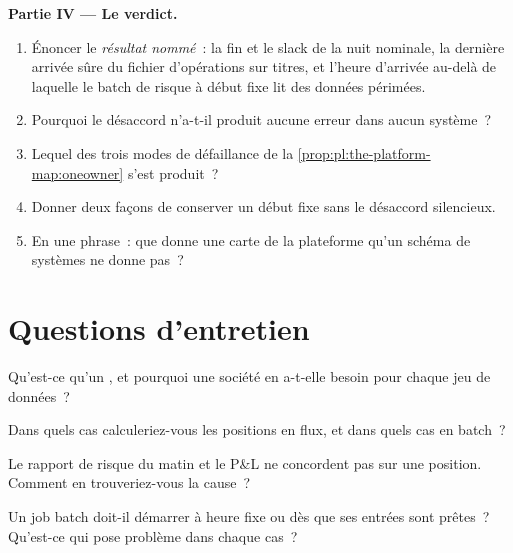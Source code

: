 \begin{problem}
\medskip\noindent\textbf{Partie IV --- Le verdict.}
\begin{enumerate}[resume]
\item Énoncer le \emph{résultat nommé}~: la fin et le slack de la nuit nominale, la dernière arrivée sûre du fichier
d'opérations sur titres, et l'heure d'arrivée au-delà de laquelle le batch de risque à début fixe lit des données périmées.
\item Pourquoi le désaccord n'a-t-il produit aucune erreur dans aucun système~?
\item Lequel des trois modes de défaillance de la \cref{prop:pl:the-platform-map:oneowner} s'est produit~?
\item Donner deux façons de conserver un début fixe sans le désaccord silencieux.
\item En une phrase~: que donne une carte de la plateforme qu'un schéma de systèmes ne donne pas~?
\end{enumerate}
\end{problem}

\section{Questions d'entretien}

\begin{interviewq}\label{iq:pl:the-platform-map:1}
Qu'est-ce qu'un , et pourquoi une société en a-t-elle besoin pour chaque jeu de données~?
\end{interviewq}

\begin{interviewq}\label{iq:pl:the-platform-map:2}
Dans quels cas calculeriez-vous les positions en flux, et dans quels cas en batch~?
\end{interviewq}

\begin{interviewq}\label{iq:pl:the-platform-map:3}
Le rapport de risque du matin et le P\&L ne concordent pas sur une position. Comment en trouveriez-vous la cause~?
\end{interviewq}

\begin{interviewq}\label{iq:pl:the-platform-map:4}
Un job batch doit-il démarrer à heure fixe ou dès que ses entrées sont prêtes~? Qu'est-ce qui pose problème dans chaque cas~?
\end{interviewq}

